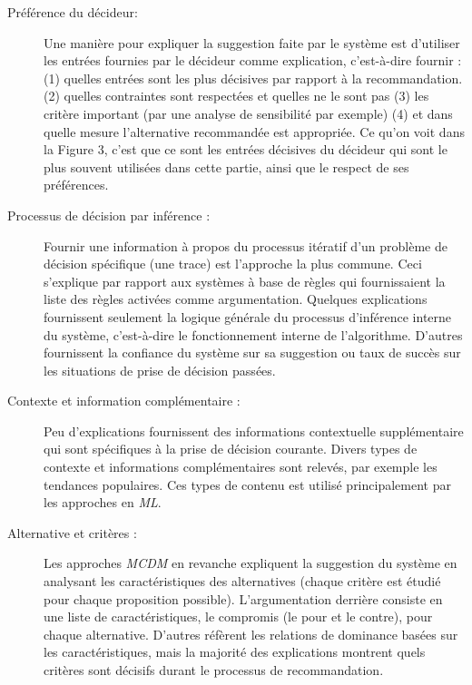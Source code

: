 \documentclass[a4paper, 11pt]{article}
\begin{document}
\begin{description}
	\item [Préférence du décideur:]
    Une manière pour expliquer la suggestion faite par le système est d’utiliser les entrées fournies par le décideur comme explication, c'est-à-dire fournir : (1) quelles entrées sont les plus décisives par rapport à la recommandation. (2) quelles contraintes sont respectées et quelles ne le sont pas (3) les critère important (par une analyse de sensibilité par exemple) (4) et dans quelle mesure l’alternative recommandée est appropriée. Ce qu'on voit dans la Figure 3, c'est que ce sont les entrées décisives du décideur qui sont le plus souvent utilisées dans cette partie, ainsi que le respect de ses préférences.\\
    
    \item [Processus de décision par inférence :] Fournir une information à propos du processus itératif d’un problème de décision spécifique (une trace) est l’approche la plus commune. Ceci s'explique par rapport aux systèmes à base de règles qui fournissaient la liste des règles activées comme argumentation. Quelques explications fournissent seulement la logique générale du processus d’inférence interne du système, c'est-à-dire le fonctionnement interne de l'algorithme. D’autres fournissent la confiance du système sur sa suggestion ou taux de succès sur les situations de prise de décision passées.\\
    
    
    \item [Contexte et information complémentaire :] Peu d'explications fournissent des informations contextuelle supplémentaire qui sont spécifiques à la prise de décision courante. Divers types de contexte et informations complémentaires sont relevés, par exemple les tendances populaires. Ces types de contenu est utilisé principalement par les approches en \textit{ML}.\\
    
    
    \item [Alternative et critères :] Les approches \textit{MCDM} en revanche expliquent la suggestion du système en analysant les caractéristiques des alternatives (chaque critère est étudié pour chaque proposition possible). L'argumentation derrière consiste en une liste de caractéristiques, le compromis (le pour et le contre), pour chaque alternative. D’autres réfèrent les relations de dominance basées sur les caractéristiques, mais la majorité des explications montrent quels critères sont décisifs durant le processus de recommandation.\\
      
\end{description}
\end{document}
